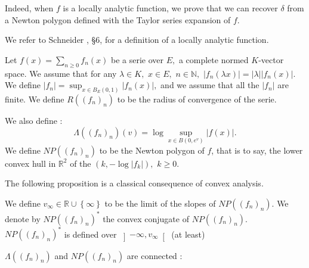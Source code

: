 \documentclass{lms}
\begin{document}
Indeed, when $f$ is a locally analytic function, we prove that we can recover $\delta$ from a Newton polygon defined with the Taylor series expansion of $f.$

We refer to Schneider \cite{Schneider}, \S 6, for a definition of a locally analytic function.

\begin{deftn} \label{deftn :  serie and norm}
Let $f(x)= \sum_{n \geq 0} f_n (x)$ be a serie over $E,$ a complete normed $K$-vector space. We assume that for any $\lambda  \in K,$ $x \in E,$ $n \in \mathbb{N},$ $\vert f_n(\lambda x) \vert = \vert \lambda \vert \vert f_n (x) \vert.$ 
We define $\vert f_n \vert = \sup_{x \in B_E(0,1)} \vert f_n(x) \vert,$ and we assume that all the $\vert f_n \vert $ are finite. We define $R((f_n)_n)$ to be the radius of convergence of the serie.

We also define : \[\Lambda((f_n)_n) (v) = \log \sup_{x \in B(0,e^v)} \vert f(x) \vert.\]
We define  $NP((f_n)_n)$ to be the Newton polygon of $f$, that is to say, the lower convex hull in $\mathbb{R}^2$ of the $(k, - \log \vert f_k \vert ),$ $k\geq 0.$ 
\end{deftn}

The following proposition is a classical consequence of convex analysis.

\begin{prop} \label{prop : conjugate Newton}
We define $v_\infty \in \mathbb{R} \cup \left\lbrace \infty \right\rbrace$ to be the limit of the slopes of $NP((f_n)_n).$
We denote by $NP((f_n)_n)^*$ the convex conjugate of $NP((f_n)_n).$ $NP((f_n)_n)^*$ is defined over $\left] -\infty,v_{\infty} \right[$ (at least)
\end{prop}

$\Lambda((f_n)_n)$ and $NP((f_n)_n)$ are connected :
\end{document}
